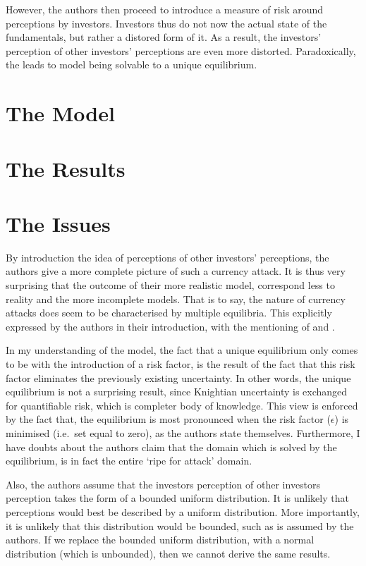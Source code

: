 \documentclass[a4paper]{report}
\begin{document}
\begin{refsection}
However, the authors then proceed to introduce a measure of risk around perceptions by investors.
Investors thus do not now the actual state of the fundamentals, but rather a distored form of it.
As a result, the investors' perception of other investors' perceptions are even more distorted.
Paradoxically, the leads to model being solvable to a unique equilibrium.

\section{The Model}


\section{The Results}


\section{The Issues}
By introduction the idea of perceptions of other investors' perceptions, the authors give a more complete picture of such a currency attack.
It is thus very surprising that the outcome of their more realistic model, correspond less to reality and the more incomplete models.
That is to say, the nature of currency attacks does seem to be characterised by multiple equilibria.
This explicitly expressed by the authors in their introduction, with the mentioning of \textcite{eichengreen1993unstable} and \textcite{dornbusch1994mexico}.

In my understanding of the model, the fact that a unique equilibrium only comes to be with the introduction of a risk factor,
is the result of the fact that this risk factor eliminates the previously existing uncertainty.
In other words, the unique equilibrium is not a surprising result, since Knightian uncertainty is exchanged for quantifiable risk,
which is completer body of knowledge.
This view is enforced by the fact that,
the equilibrium is most pronounced when the risk factor ($\epsilon$) is minimised (i.e.~set equal to zero),
as the authors state themselves.
Furthermore, I have doubts about the authors claim that the domain which is solved by the equilibrium,
is in fact the entire `ripe for attack' domain.

Also, the authors assume that the investors perception of other investors perception takes the form of a bounded uniform distribution.
It is unlikely that perceptions would best be described by a uniform distribution.
More importantly, it is unlikely that this distribution would be bounded, such as is assumed by the authors.
If we replace the bounded uniform distribution, with a normal distribution (which is unbounded),
then we cannot derive the same results.

\nocite{taleb2010black}
\printbibliography
\end{refsection}
\end{document}
